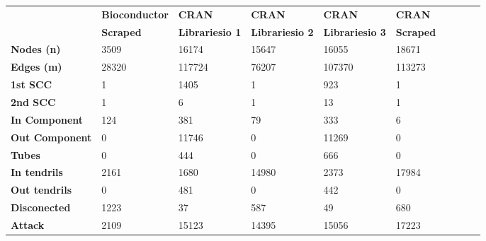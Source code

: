 \begin{table}[ht!]
    \centering
    \label{tab:data_bc_cran}
    \tiny
    \begin{tabular}{|l|l|l|l|l|l|l|l|l|l|}
        \hline
        \textbf{}              & \textbf{Bioconductor} & \textbf{CRAN}          & \textbf{CRAN}          & \textbf{CRAN}          & \textbf{CRAN}    \\
                               & \textbf{Scraped}      & \textbf{Librariesio 1} & \textbf{Librariesio 2} & \textbf{Librariesio 3} & \textbf{Scraped} \\
        \hline
        \textbf{Nodes (n)}     & 3509                  & 16174                  & 15647                  & 16055                  & 18671            \\
        \textbf{Edges (m)}     & 28320                 & 117724                 & 76207                  & 107370                 & 113273           \\
        \textbf{1st SCC}       & 1                     & 1405                   & 1                      & 923                    & 1                \\
        \textbf{2nd SCC}       & 1                     & 6                      & 1                      & 13                     & 1                \\
        \textbf{In Component}  & 124                   & 381                    & 79                     & 333                    & 6                \\
        \textbf{Out Component} & 0                     & 11746                  & 0                      & 11269                  & 0                \\
        \textbf{Tubes}         & 0                     & 444                    & 0                      & 666                    & 0                \\
        \textbf{In tendrils}   & 2161                  & 1680                   & 14980                  & 2373                   & 17984            \\
        \textbf{Out tendrils}  & 0                     & 481                    & 0                      & 442                    & 0                \\
        \textbf{Disconected}   & 1223                  & 37                     & 587                    & 49                     & 680              \\
        \textbf{Attack}        & 2109                  & 15123                  & 14395                  & 15056                  & 17223            \\

\end{tabular}
\end{table}
